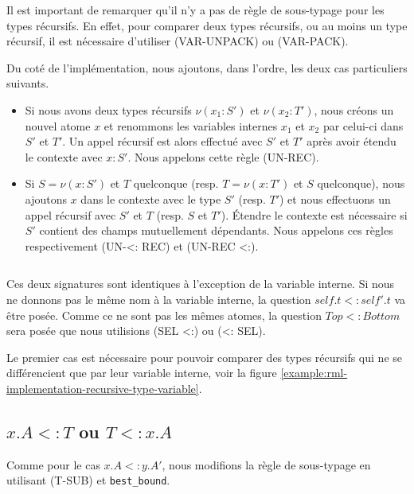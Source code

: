 Il est important de remarquer qu'il n'y a pas de règle de sous-typage pour les
types récursifs. En effet, pour comparer deux types récursifs, ou au moins un
type récursif, il est nécessaire d'utiliser (VAR-UNPACK) ou (VAR-PACK).

Du coté de l'implémentation, nous ajoutons, dans l'ordre, les deux cas
particuliers suivants.

\begin{itemize}
\item Si nous avons deux types récursifs $\nu(x_{1} : S')$ et $\nu(x_{2} : T')$,
nous créons un nouvel atome $x$ et renommons les variables internes $x_{1}$ et
$x_{2}$ par celui-ci dans $S'$ et $T'$. Un appel récursif est alors effectué
avec $S'$ et $T'$ après avoir étendu le contexte avec $x : S'$. Nous appelons
cette règle (UN-REC).
\item Si $S = \nu(x : S')$ et $T$ quelconque (resp. $T = \nu(x : T')$ et $S$
  quelconque), nous ajoutons $x$ dans le contexte avec le type $S'$ (resp. $T'$) et
  nous effectuons un appel récursif avec $S'$ et $T$ (resp. $S$ et $T'$). Étendre
  le contexte est nécessaire si $S'$ contient des champs mutuellement dépendants.
  Nous appelons ces règles respectivement (UN-<: REC) et (UN-REC <:).
\end{itemize}

\begin{listing}
  \inputminted{OCaml}{codes/rml_implementation_recursive_type.rml}
  \caption{Ces deux signatures sont identiques à l'exception de la variable
    interne. Si nous ne donnons pas le même nom à la variable interne, la
    question $self.t <: self'.t$ va être posée. Comme ce ne sont pas les mêmes
    atomes, la question $Top <: Bottom$ sera posée que nous utilisions (SEL <:) ou
    (<: SEL).}
  \label{example:rml-implementation-recursive-type-variable}
\end{listing}

Le premier cas est nécessaire pour pouvoir comparer des types récursifs qui ne
se différencient que par leur variable interne, voir la figure
\ref{example:rml-implementation-recursive-type-variable}.

\subsection*{$x.A <: T$ ou $T <: x.A$}

Comme pour le cas $x.A <: y.A'$, nous modifions la règle de sous-typage en
utilisant (T-SUB) et \verb|best_bound|.


